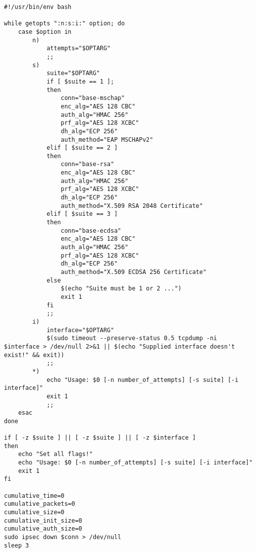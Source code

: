 \documentclass[
10pt, %
a4paper, %
oneside, %
headinclude,footinclude, %
BCOR5mm, %
]{scrartcl}
\begin{document}
\begin{lstlisting}
#!/usr/bin/env bash

while getopts ":n:s:i:" option; do
    case $option in
        n)
      	    attempts="$OPTARG"
      		;;
        s)
            suite="$OPTARG"
            if [ $suite == 1 ];
			then
                conn="base-mschap"
                enc_alg="AES 128 CBC"
                auth_alg="HMAC 256"
                prf_alg="AES 128 XCBC"
                dh_alg="ECP 256"
                auth_method="EAP MSCHAPv2"
            elif [ $suite == 2 ]
            then
                conn="base-rsa"
                enc_alg="AES 128 CBC"
                auth_alg="HMAC 256"
                prf_alg="AES 128 XCBC"
                dh_alg="ECP 256"
                auth_method="X.509 RSA 2048 Certificate"
            elif [ $suite == 3 ]
            then
                conn="base-ecdsa"
                enc_alg="AES 128 CBC"
                auth_alg="HMAC 256"
                prf_alg="AES 128 XCBC"
                dh_alg="ECP 256"
                auth_method="X.509 ECDSA 256 Certificate"
            else
                $(echo "Suite must be 1 or 2 ...")
                exit 1
            fi
            ;;
        i)
            interface="$OPTARG"
            $(sudo timeout --preserve-status 0.5 tcpdump -ni $interface > /dev/null 2>&1 || $(echo "Supplied interface doesn't exist!" && exit))
            ;;
        *)
            echo "Usage: $0 [-n number_of_attempts] [-s suite] [-i interface]"
            exit 1
            ;;
    esac
done

if [ -z $suite ] || [ -z $suite ] || [ -z $interface ]
then
    echo "Set all flags!"
    echo "Usage: $0 [-n number_of_attempts] [-s suite] [-i interface]"
    exit 1
fi

cumulative_time=0
cumulative_packets=0
cumulative_size=0
cumulative_init_size=0
cumulative_auth_size=0
sudo ipsec down $conn > /dev/null
sleep 3


\end{lstlisting}
\end{document}
